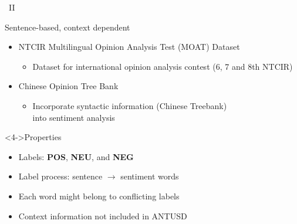 \documentclass[compress]{beamer}
\begin{document}
        \begin{frame}{\subsecname\ II}
            \begin{block}{Sentence-based, context dependent}
                \begin{itemize}
                    \item<1-> NTCIR Multilingual Opinion Analysis Test (MOAT) Dataset
                        \begin{itemize}
                            \item<2->  Dataset for international opinion analysis contest (6, 7 and 8th NTCIR)
                        \end{itemize}

                    \item<1-> Chinese Opinion Tree Bank
                        \begin{itemize}
                            \item<3-> Incorporate syntactic information (Chinese Treebank)\\ into sentiment analysis
                        \end{itemize}
                \end{itemize}
            \end{block}
            \begin{block}<4->{Properties}
                \begin{itemize}
                    \item Labels: \textbf{POS}, \textbf{NEU}, and \textbf{NEG}
                    \item Label process:  sentence $\rightarrow$ sentiment words
                    \item Each word might belong to conflicting labels
                    \item Context information not included in ANTUSD
                \end{itemize}
            \end{block}
        \end{frame}
\end{document}
